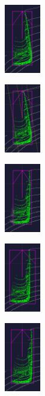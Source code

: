 \documentclass[letterpaper, 10 pt, conference]{ieeeconf}  %
\begin{document}
\begin{figure}[t]
	\centering
	
	\begin{subfigure}[t]{0.18\linewidth}
		\includegraphics[height=3cm]{./figures/rotation-begin}
		\caption{}
		\label{fig:box-before-rotate}
	\end{subfigure}\hfill
	\begin{subfigure}[t]{0.18\linewidth}
		\includegraphics[height=3cm]{./figures/rotation-dotted-lines}
		\caption{}
		\label{fig:box-rotate-in-subview}
	\end{subfigure}\hfill
	\begin{subfigure}[t]{0.18\linewidth}
		\includegraphics[height=3cm]{./figures/rotation-fail-points-go-out}
		\caption{}
		\label{fig:box-rotate-naively}
	\end{subfigure}\hfill
	\begin{subfigure}[t]{0.18\linewidth}
		\includegraphics[height=3cm]{./figures/rotation-fail-by-ground-plane}
		\caption{}
		\label{fig:box-rotate-fail-by-ground}
	\end{subfigure}\hfill
	\begin{subfigure}[t]{0.18\linewidth}
		\includegraphics[height=3cm]{./figures/rotation-succeeded}

\end{subfigure}
\end{figure}
\end{document}
